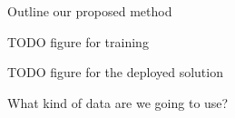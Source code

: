Outline our proposed method

TODO figure for training

TODO figure for the deployed solution

What kind of data are we going to use?
